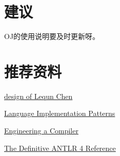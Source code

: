 \documentclass[a4paper]{article}
\begin{document}
\section{建议}
OJ的使用说明要及时更新呀。

\section{推荐资料}
\href{https://github.com/abcdabcd987/compiler2016/blob/master/design/presentation.pdf}{design of Lequn Chen}

\href{https://book.douban.com/subject/4030327/}{Language Implementation Patterns}

\href{https://book.douban.com/subject/5288601/}{Engineering a Compiler}

\href{https://book.douban.com/subject/17912658/}{The Definitive ANTLR 4 Reference}
\end{document}
